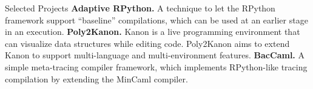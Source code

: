 \begin{rubric}{Selected Projects}
  \entry*[2021-] \textbf{Adaptive RPython.} A technique to let the RPython framework
  support “baseline” compilations, which can be used at an  earlier stage in an
  execution.
  \entry*[2020-] \textbf{Poly2Kanon.} Kanon is a live programming environment that can
  visualize data structures while editing code. Poly2Kanon aims to extend Kanon to
  support multi-language and multi-environment features.
  \entry*[2019-2020] \textbf{BacCaml.} A simple meta-tracing compiler framework,
  which implements RPython-like tracing compilation by extending the MinCaml compiler.
\end{rubric}
